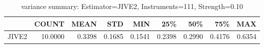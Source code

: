 \begin{table}[ht]
\centering
\caption{variance summary: Estimator=JIVE2, Instruments=111, Strength=0.10}
\begin{tabular}{lrrrrrrrr}
\toprule
 & COUNT & MEAN & STD & MIN & 25\% & 50\% & 75\% & MAX \\
\midrule
JIVE2 & 10.0000 & 0.3398 & 0.1685 & 0.1541 & 0.2398 & 0.2990 & 0.4176 & 0.6354 \\
\bottomrule
\end{tabular}
\end{table}
